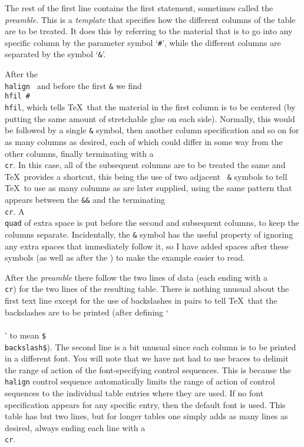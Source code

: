 The rest of the first line contains the first statement, sometimes called
the {\sl preamble}. This is a {\sl template} that specifies how the
different columns of the table are to be treated. It does this by
referring to the material that is to go into any specific column by the
parameter symbol `{\tt \#}', while the different columns are separated by
the symbol `{\tt \&}'.  

After the {\tt \\halign \lbr} and before the first {\tt \&} we find {\tt
\\hfil \#\\hfil}, which tells \TeX\ that the material in the first
column is to be centered (by putting the same amount of stretchable
glue on each side).
Normally, this would be followed by a
single {\tt \&} symbol, then another column specification and so on for
as many columns as desired, each of which could differ in some way from
the other columns, finally terminating with a {\tt \\cr}.  In this case,
all of the subsequent columns are to be treated the
same and \TeX\ provides a shortcut, this being the use of two adjacent {\tt
\&} symbols to tell \TeX\ to use as many columns as are later supplied, using
the same pattern that appears between the {\tt \&\&} and the terminating {\tt \\cr}.
A {\tt \\quad} of extra space is put before the second and subsequent
columns, to keep the columns separate.
Incidentally, the {\tt \&} symbol
has the useful property of ignoring any extra spaces that immediately
follow it, so I have added spaces after these symbols (as well as after
the \css\/) to make the example easier to read.

After the {\sl preamble} there follow the two lines of data (each ending with a
{\tt \\cr}) for the two lines of the resulting table. There is nothing
unusual about the first text line except for the use of backslashes in
pairs to tell \TeX\ that the backslashes are to be printed
(after defining `{\tt\\\\}' to mean {\tt\$\\backslash\$}). The
second line is a bit unusual since each column is to be printed in a
different font.  You will note that we have not had to use braces to
delimit the range of action of the font-specifying control sequences. This
is because the {\tt \\halign} control sequence automatically limits the
range of action of control sequences to the individual table entries where
they are used.  If no font specification appears for any specific entry,
then the default font is used. This table has but two lines, but for
longer tables one simply adds as many lines as desired, always ending each
line with a {\tt \\cr}.

